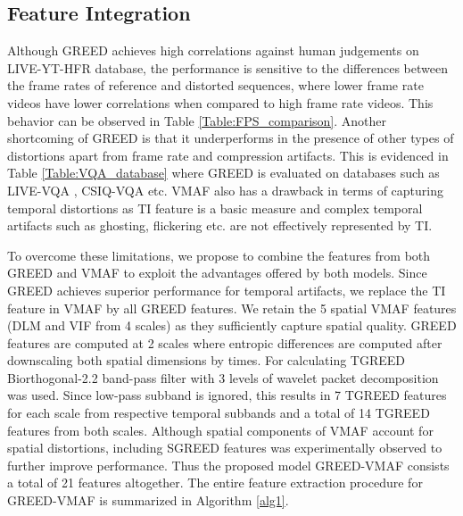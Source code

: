\documentclass[conference]{IEEEtran}
\begin{document}
\subsection{Feature Integration}
\label{sec:feat_integration}
Although GREED achieves high correlations against human judgements on LIVE-YT-HFR database, the performance is sensitive to the differences between the frame rates of reference and distorted sequences, where lower frame rate videos have lower correlations when compared to high frame rate videos. This behavior can be observed in Table \ref{Table:FPS_comparison}. Another shortcoming of GREED is that it underperforms in the presence of other types of distortions apart from frame rate and compression artifacts. This is evidenced in Table \ref{Table:VQA_database} where GREED is evaluated on databases such as LIVE-VQA \cite{seshadrinathan2010study}, CSIQ-VQA \cite{vu2014vis3} etc. VMAF also has a drawback in terms of capturing temporal distortions as TI feature is a basic measure and complex temporal artifacts such as ghosting, flickering etc. are not effectively represented by TI.

To overcome these limitations, we propose to combine the features from both GREED and VMAF to exploit the advantages offered by both models. Since GREED achieves superior performance for temporal artifacts, we replace the TI feature in VMAF by all GREED features. We retain the 5 spatial VMAF features (DLM and VIF from 4 scales) as they sufficiently capture spatial quality. GREED features are computed at 2 scales  where entropic differences are computed after downscaling both spatial dimensions by  times. For calculating TGREED Biorthogonal-2.2 band-pass filter with 3 levels of wavelet packet decomposition \cite{coifman1992entropy} was used. Since low-pass subband is ignored, this results in 7 TGREED features for each scale from respective temporal subbands and a total of 14 TGREED features from both scales. Although spatial components of VMAF account for spatial distortions, including SGREED features was experimentally observed to further improve performance. Thus the proposed model GREED-VMAF consists a total of 21 features altogether. The entire feature extraction procedure for GREED-VMAF is summarized in Algorithm \ref{alg1}.
\end{document}
